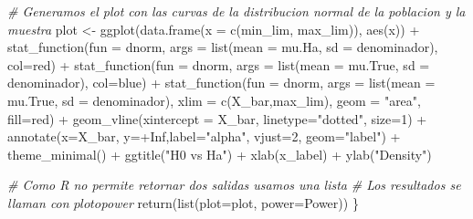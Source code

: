 \documentclass[]{article}
\newenvironment{Shaded}{\begin{snugshade}}{\end{snugshade}}
\newcommand{\AttributeTok}[1]{\textcolor[rgb]{0.77,0.63,0.00}{#1}}
\newcommand{\CommentTok}[1]{\textcolor[rgb]{0.56,0.35,0.01}{\textit{#1}}}
\newcommand{\ConstantTok}[1]{\textcolor[rgb]{0.00,0.00,0.00}{#1}}
\newcommand{\DecValTok}[1]{\textcolor[rgb]{0.00,0.00,0.81}{#1}}
\newcommand{\FunctionTok}[1]{\textcolor[rgb]{0.00,0.00,0.00}{#1}}
\newcommand{\NormalTok}[1]{#1}
\newcommand{\OtherTok}[1]{\textcolor[rgb]{0.56,0.35,0.01}{#1}}
\newcommand{\SpecialCharTok}[1]{\textcolor[rgb]{0.00,0.00,0.00}{#1}}
\newcommand{\StringTok}[1]{\textcolor[rgb]{0.31,0.60,0.02}{#1}}
\begin{document}
\begin{Shaded}
\begin{Highlighting}[]
    \CommentTok{\# Generamos el plot con las curvas de la distribucion normal de la poblacion y la muestra}
\NormalTok{    plot }\OtherTok{\textless{}{-}} \FunctionTok{ggplot}\NormalTok{(}\FunctionTok{data.frame}\NormalTok{(}\AttributeTok{x =} \FunctionTok{c}\NormalTok{(min\_lim, max\_lim)), }\FunctionTok{aes}\NormalTok{(x)) }\SpecialCharTok{+} 
      \FunctionTok{stat\_function}\NormalTok{(}\AttributeTok{fun =}\NormalTok{ dnorm, }\AttributeTok{args =} \FunctionTok{list}\NormalTok{(}\AttributeTok{mean =}\NormalTok{ mu.Ha, }\AttributeTok{sd =}\NormalTok{ denominador), }
                    \AttributeTok{col=}\StringTok{\textquotesingle{}red\textquotesingle{}}\NormalTok{) }\SpecialCharTok{+}
      \FunctionTok{stat\_function}\NormalTok{(}\AttributeTok{fun =}\NormalTok{ dnorm, }\AttributeTok{args =} \FunctionTok{list}\NormalTok{(}\AttributeTok{mean =}\NormalTok{ mu.True, }\AttributeTok{sd =}\NormalTok{ denominador), }
                    \AttributeTok{col=}\StringTok{\textquotesingle{}blue\textquotesingle{}}\NormalTok{) }\SpecialCharTok{+}
      \FunctionTok{stat\_function}\NormalTok{(}\AttributeTok{fun =}\NormalTok{ dnorm, }\AttributeTok{args =} \FunctionTok{list}\NormalTok{(}\AttributeTok{mean =}\NormalTok{ mu.True, }\AttributeTok{sd =}\NormalTok{ denominador), }
                    \AttributeTok{xlim =} \FunctionTok{c}\NormalTok{(X\_bar,max\_lim), }\AttributeTok{geom =} \StringTok{"area"}\NormalTok{, }\AttributeTok{fill=}\StringTok{\textquotesingle{}red\textquotesingle{}}\NormalTok{) }\SpecialCharTok{+} 
      \FunctionTok{geom\_vline}\NormalTok{(}\AttributeTok{xintercept =}\NormalTok{ X\_bar, }\AttributeTok{linetype=}\StringTok{"dotted"}\NormalTok{, }\AttributeTok{size=}\DecValTok{1}\NormalTok{) }\SpecialCharTok{+}
      \FunctionTok{annotate}\NormalTok{(}\AttributeTok{x=}\NormalTok{X\_bar, }\AttributeTok{y=}\SpecialCharTok{+}\ConstantTok{Inf}\NormalTok{,}\AttributeTok{label=}\StringTok{"alpha"}\NormalTok{, }\AttributeTok{vjust=}\DecValTok{2}\NormalTok{, }\AttributeTok{geom=}\StringTok{"label"}\NormalTok{) }\SpecialCharTok{+}
      \FunctionTok{theme\_minimal}\NormalTok{() }\SpecialCharTok{+}
      \FunctionTok{ggtitle}\NormalTok{(}\StringTok{"H0 vs Ha"}\NormalTok{) }\SpecialCharTok{+}
      \FunctionTok{xlab}\NormalTok{(x\_label) }\SpecialCharTok{+}
      \FunctionTok{ylab}\NormalTok{(}\StringTok{"Density"}\NormalTok{)}

  \CommentTok{\# Como R no permite retornar dos salidas usamos una lista}
  \CommentTok{\# Los resultados se llaman con $plot o $power}
  \FunctionTok{return}\NormalTok{(}\FunctionTok{list}\NormalTok{(}\AttributeTok{plot=}\NormalTok{plot, }\AttributeTok{power=}\NormalTok{Power))}
\NormalTok{\}}
\end{Highlighting}
\end{Shaded}
\end{document}
